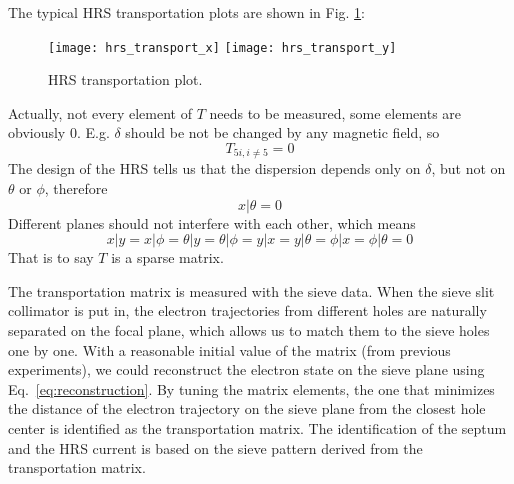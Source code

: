 The typical HRS transportation plots are shown in Fig. \ref{fig:hrs_transport}:
\begin{figure}[!h]
    \texttt{[image: hrs\_transport\_x]}
    \texttt{[image: hrs\_transport\_y]}
    \caption{HRS transportation plot. 
    } %
    \label{fig:hrs_transport}
\end{figure}

Actually, not every element of $T$ needs to be measured, some elements are obviously
0. E.g. $\delta$ should be not be changed by any magnetic field, so 
\begin{equation}
    T_{5i, i\ne 5} = 0
\end{equation}
The design of the HRS tells us that the dispersion depends only on $\delta$, but not
on $\theta$ or $\phi$, therefore 
\begin{equation}
    x|\theta = 0
\end{equation}
Different planes should not interfere with each other, which means 
\begin{equation}
    x|y = x|\phi = \theta|y = \theta|\phi = y|x = y|\theta = \phi|x = \phi|\theta = 0
\end{equation}
That is to say $T$ is a sparse matrix.

The transportation matrix is measured with the sieve data. 
When the sieve slit collimator is put in, the electron trajectories
from different holes are naturally separated on the focal plane, which allows
us to match them to the sieve holes one by one. With a reasonable initial value of 
the matrix (from previous experiments),
we could reconstruct the electron state on the sieve plane using Eq.~\ref{eq:reconstruction}.
By tuning the matrix elements, the one that minimizes the distance of the 
electron trajectory on the sieve plane from the closest hole center 
is identified as the transportation matrix. %
The identification of the septum and the HRS current is based on the sieve pattern 
derived from the transportation matrix. 



